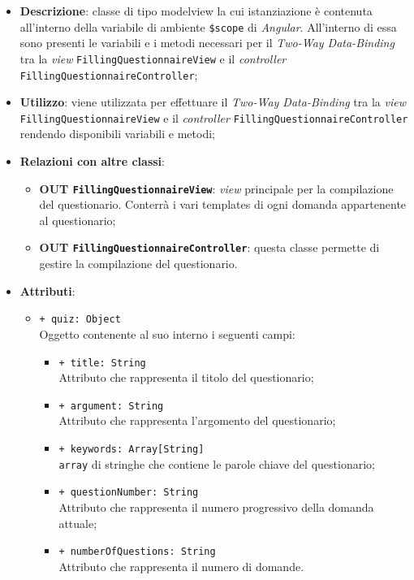 	\begin{itemize}
		\item \textbf{Descrizione}: classe di tipo modelview la cui istanziazione è contenuta all'interno della variabile di ambiente \texttt{\$scope} di \textit{Angular}. All'interno di essa sono presenti le variabili e i metodi necessari per il \textit{Two-Way Data-Binding} tra la \textit{view} \texttt{FillingQuestionnaireView} e il \textit{controller} \texttt{FillingQuestionnaireController};
		\item \textbf{Utilizzo}: viene utilizzata per effettuare il \textit{Two-Way Data-Binding} tra la \textit{view}\\ \texttt{FillingQuestionnaireView} e il \textit{controller} \texttt{FillingQuestionnaireController} rendendo disponibili variabili e metodi;
		\item \textbf{Relazioni con altre classi}: 
		\begin{itemize}
			\item \textbf{OUT \texttt{FillingQuestionnaireView}}: \textit{view} principale per la compilazione del questionario. Conterrà i vari templates di ogni domanda appartenente al questionario; 
			\item \textbf{OUT \texttt{FillingQuestionnaireController}}: questa classe permette di gestire la compilazione del questionario.
		\end{itemize}
		\item \textbf{Attributi}: 
		\begin{itemize}
			\item \texttt{+ quiz: Object} \\ Oggetto contenente al suo interno i seguenti campi:
			\begin{itemize}
				\item \texttt{+ title: String} \\ Attributo che rappresenta il titolo del questionario;
				\item \texttt{+ argument: String} \\ Attributo che rappresenta l'argomento del questionario;
				\item \texttt{+ keywords: Array[String]} \\ \texttt{array} di stringhe che contiene le parole chiave del questionario;
				\item \texttt{+ questionNumber: String} \\ Attributo che rappresenta il numero progressivo della domanda attuale;
				\item \texttt{+ numberOfQuestions: String} \\ Attributo che rappresenta il numero di domande.

\end{itemize}
\end{itemize}
\end{itemize}
